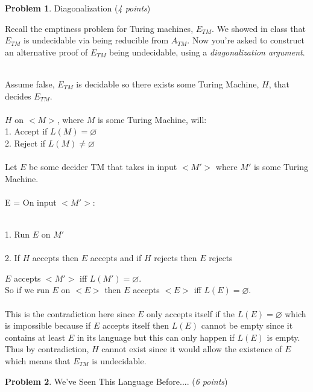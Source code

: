 \documentclass[11pt]{article}
\theoremstyle{definition}
\theoremstyle{theorem}
\newtheorem{prob}{Problem}
\newcommand{\solution}{\medskip\noindent{\color{blue}\textbf{Solution:}}}
\begin{document}
\begin{prob} Diagonalization (\emph{4 points}) \end{prob}

Recall the emptiness problem for Turing machines, $E_{TM}$. We showed in class that  $E_{TM}$ is undecidable via being reducible from $A_{TM}$. Now you're asked to construct an alternative proof of $E_{TM}$ being undecidable, using a \emph{diagonalization argument}. 

\solution\\
Assume false, $E_{TM}$ is decidable so there exists some Turing Machine, $H$, that decides $E_{TM}$. \\~\\
$H$ on $<M>$, where $M$ is some Turing Machine, will: \\
1. Accept if $L(M) = \varnothing$ \\
2. Reject if $L(M) \neq \varnothing$ \\~\\
Let $E$ be some decider TM that takes in input $<M'>$ where $M'$ is some Turing Machine. \\~\\
E = On input $<M'>$:\\~\\
\hspace*{0.5cm}
\begin{minipage}{1.8\textwidth}
	1. Run $E$ on $M'$ \\~\\
	2. If $H$ accepts then $E$ accepts and if $H$ rejects then $E$ rejects\\
\end{minipage}

\noindent $E$ accepts $<M'>$ iff $L(M') = \varnothing$. \\
So if we run $E$ on $<E>$ then $E$ accepts $<E>$ iff $L(E) = \varnothing$. \\~\\
\noindent This is the contradiction here since $E$ only accepts itself if the $L(E) = \varnothing$ which is impossible because if $E$ accepts itself then $L(E)$ cannot be empty since it contains at least $E$ in its language but this can only happen if $L(E)$ is empty. Thus by contradiction, $H$ cannot exist since it would allow the existence of $E$ which means that $E_{TM}$ is undecidable. 



\newpage

\begin{prob} We've Seen This Language Before.... (\emph{6 points})\end{prob}
\end{document}
